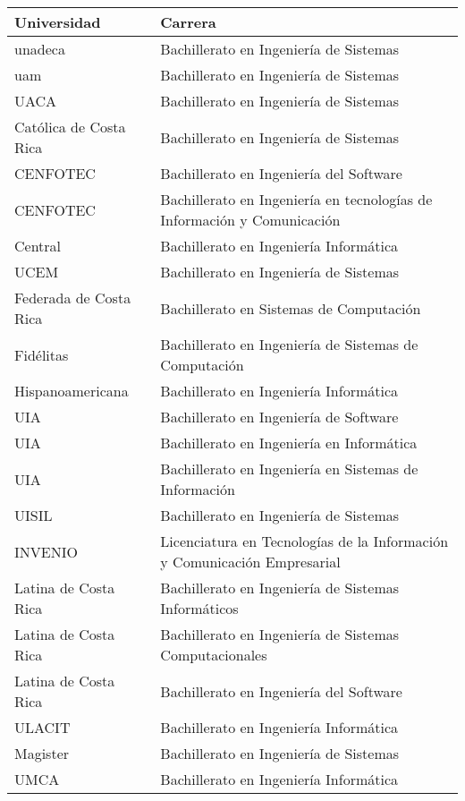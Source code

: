 \begin{table}[h!]
    \footnotesize
    \begin{tabular}{ll}
        \toprule[1.5pt]
        \textbf{Universidad} & \textbf{Carrera}\\
        \midrule
        \gls{unadeca} & Bachillerato en Ingeniería de Sistemas \\
        \gls{uam} & Bachillerato en Ingeniería de Sistemas \\
        UACA &	Bachillerato en Ingeniería de Sistemas \\
        Católica de Costa Rica & 	Bachillerato en Ingeniería de Sistemas \\
        CENFOTEC	& Bachillerato en Ingeniería del Software \\
        CENFOTEC & Bachillerato en Ingeniería en tecnologías de Información y Comunicación \\
        Central &  Bachillerato en Ingeniería Informática \\ 
        UCEM & Bachillerato en Ingeniería de Sistemas \\
        Federada de Costa Rica & Bachillerato en Sistemas de Computación \\
        Fidélitas & Bachillerato en Ingeniería de Sistemas de Computación \\
        Hispanoamericana &	Bachillerato en Ingeniería Informática \\
        UIA &	Bachillerato en Ingeniería de Software \\
        UIA &	Bachillerato en Ingeniería en Informática \\
        UIA &	Bachillerato en Ingeniería en Sistemas de Información \\
        UISIL &	Bachillerato en Ingeniería de Sistemas \\
        INVENIO & Licenciatura en Tecnologías de la Información y Comunicación Empresarial \\
        Latina de Costa Rica & Bachillerato en Ingeniería de Sistemas Informáticos \\
        Latina de Costa Rica & Bachillerato en Ingeniería de Sistemas Computacionales \\
        Latina de Costa Rica & Bachillerato en Ingeniería del Software \\
        ULACIT & Bachillerato en Ingeniería Informática \\
        Magister & Bachillerato en Ingeniería de Sistemas \\
        UMCA & Bachillerato en Ingeniería Informática \\

\end{tabular}
\end{table}
